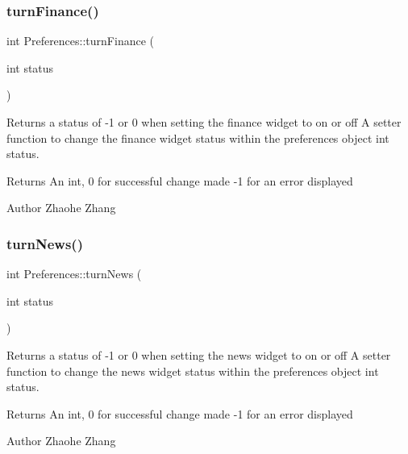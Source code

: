 \subsubsection{\texorpdfstring{turn\+Finance()}{turnFinance()}}
{\footnotesize\ttfamily int Preferences\+::turn\+Finance (\begin{DoxyParamCaption}\item[{int}]{status }\end{DoxyParamCaption})}



Returns a status of -\/1 or 0 when setting the finance widget to on or off  A setter function to change the finance widget status within the preferences object  int status. 

\begin{DoxyReturn}{Returns}
An int, 0 for successful change made -\/1 for an error displayed 
\end{DoxyReturn}
\begin{DoxyAuthor}{Author}
Zhaohe Zhang 
\end{DoxyAuthor}
\mbox{\label{class_preferences_afd7d3c7e5afa2d73087137d63ec0eccc}} 
\subsubsection{\texorpdfstring{turn\+News()}{turnNews()}}
{\footnotesize\ttfamily int Preferences\+::turn\+News (\begin{DoxyParamCaption}\item[{int}]{status }\end{DoxyParamCaption})}



Returns a status of -\/1 or 0 when setting the news widget to on or off  A setter function to change the news widget status within the preferences object  int status. 

\begin{DoxyReturn}{Returns}
An int, 0 for successful change made -\/1 for an error displayed 
\end{DoxyReturn}
\begin{DoxyAuthor}{Author}
Zhaohe Zhang 
\end{DoxyAuthor}
\mbox{\label{class_preferences_a59db5bdccd2dbae9aa3fa5e71580d69f}} 
